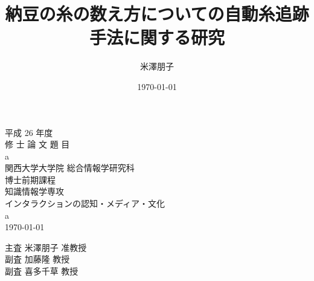 \documentclass[11pt]{jreport}
\title{納豆の糸の数え方についての自動糸追跡手法に関する研究}
\author{米澤朋子}
\date{\today}
\newcommand{\thetitle}{a}
\newcommand{\theauthor}{a}
\begin{document}
\thispagestyle{empty}
\begin{center}
\huge{平成 26 年度}\\
\Huge{修 士 論 文 題 目}\\
\vspace{1.5cm}\huge{\thetitle}\\ \vspace{3.0cm}
\LARGE{関西大学大学院 総合情報学研究科}\\
\LARGE{博士前期課程}\\
\LARGE{知識情報学専攻}\\
\vspace{0.8cm}\Large{インタラクションの認知・メディア・文化}\\
\vspace{0.8cm}\LARGE{\theauthor}\\ \vspace{1.0cm}
\today\vspace{1.5cm}
\begin{itemize}
\LARGE{主査\hspace{2cm} 米澤朋子 准教授}\\
\LARGE{副査\hspace{2cm} 加藤隆 教授}\\
\LARGE{副査\hspace{2cm} 喜多千草 教授}\\
\end{itemize}
\end{center}


\tableofcontents
\listoftables
\listoffigures













\end{document}
